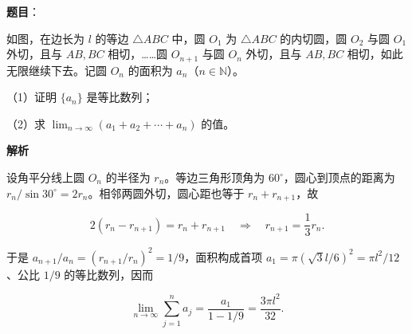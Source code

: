 \begin{answer}

\textbf{题目}：

如图，在边长为 $l$ 的等边 $\triangle ABC$ 中，圆 $O_1$ 为 $\triangle ABC$ 的内切圆，圆 $O_2$ 与圆 $O_1$ 外切，且与 $AB,BC$ 相切，……圆 $O_{n+1}$ 与圆 $O_n$ 外切，且与 $AB,BC$ 相切，如此无限继续下去。记圆 $O_n$ 的面积为 $a_n$（$n\in\mathbb{N}$）。

（1）证明 $\{a_n\}$ 是等比数列；

（2）求 $\displaystyle\lim_{n\to\infty}(a_1+a_2+\cdots+a_n)$ 的值。
\nopagebreak[4]
\begin{center}\end{center}
\nopagebreak[4]
\textbf{解析}

设角平分线上圆 $O_n$ 的半径为 $r_n$。等边三角形顶角为 $60^\circ$，圆心到顶点的距离为 $r_n/\sin30^\circ=2r_n$。相邻两圆外切，圆心距也等于 $r_n+r_{n+1}$，故

\nopagebreak[4]
\[
2(r_n-r_{n+1})=r_n+r_{n+1}
\quad\Longrightarrow\quad
r_{n+1}=\frac13r_n.
\]

于是 $a_{n+1}/a_n=(r_{n+1}/r_n)^2=1/9$，面积构成首项 $a_1=\pi(\sqrt3l/6)^2=\pi l^2/12$、公比 $1/9$ 的等比数列，因而

\nopagebreak[4]
\[
\lim_{n\to\infty}\sum_{j=1}^n a_j
=\frac{a_1}{1-1/9}
=\frac{3\pi l^2}{32}.
\]


\end{answer}